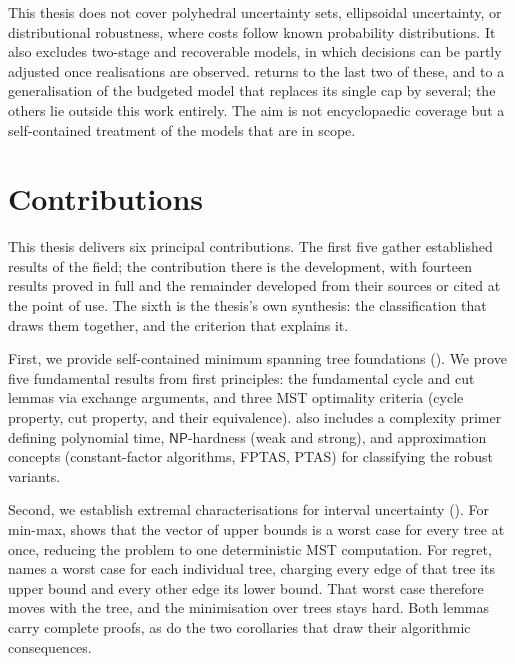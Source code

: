 This thesis does not cover polyhedral uncertainty sets, ellipsoidal uncertainty, or distributional robustness, where costs follow known probability distributions.
It also excludes two-stage and recoverable models, in which decisions can be partly adjusted once realisations are observed.
 returns to the last two of these, and to a generalisation of the budgeted model that replaces its single cap by several; the others lie outside this work entirely.
The aim is not encyclopaedic coverage but a self-contained treatment of the models that are in scope.

\section{Contributions}\label{sec:intro-contributions}

This thesis delivers six principal contributions.
The first five gather established results of the field; the contribution there is the development, with fourteen results proved in full and the remainder developed from their sources or cited at the point of use.
The sixth is the thesis's own synthesis: the classification that draws them together, and the criterion that explains it.

First, we provide self-contained minimum spanning tree foundations ().
We prove five fundamental results from first principles: the fundamental cycle and cut lemmas via exchange arguments, and three MST optimality criteria (cycle property, cut property, and their equivalence).
 also includes a complexity primer defining polynomial time, $\mathsf{NP}$-hardness (weak and strong), and approximation concepts (constant-factor algorithms, FPTAS, PTAS) for classifying the robust variants.

Second, we establish extremal characterisations for interval uncertainty ().
For min-max,  shows that the vector of upper bounds is a worst case for every tree at once, reducing the problem to one deterministic MST computation.
For regret,  names a worst case for each individual tree, charging every edge of that tree its upper bound and every other edge its lower bound.
That worst case therefore moves with the tree, and the minimisation over trees stays hard.
Both lemmas carry complete proofs, as do the two corollaries that draw their algorithmic consequences.

